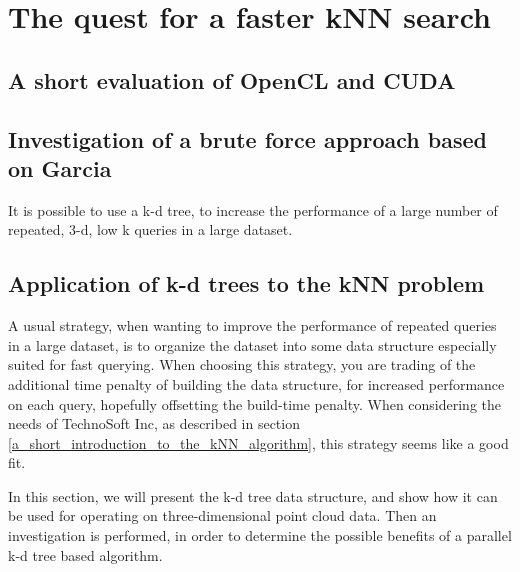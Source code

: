 
\section{The quest for a faster kNN search} %
\label{sec:the_quest_for_a_faster_knn_search}

\subsection{A short evaluation of OpenCL and CUDA} %
\label{sub:a_short_evaluation_of_opencl_and_cuda}


\subsection{Investigation of a brute force approach based on Garcia} %
\label{sub:investigation_of_a_brute_force_approach_based_on_garcia}


\begin{myrq}
\label{rq:structure_aml}
    It is possible to use a k-d tree, to increase the performance of a large number of repeated, 3-d, low k queries in a large dataset.
\end{myrq}


\subsection{Application of k-d trees to the kNN problem} %
\label{sub:application_of_kd_trees_to_the_knn_problem}

A usual strategy, when wanting to improve the performance of repeated queries in a large dataset, is to organize the dataset into some data structure especially suited for fast querying. When choosing this strategy, you are trading of the additional time penalty of building the data structure, for increased performance on each query, hopefully offsetting the build-time penalty. When considering the needs of TechnoSoft Inc, as described in section \ref{a_short_introduction_to_the_kNN_algorithm}, this strategy seems like a good fit.

In this section, we will present the k-d tree data structure, and show how it can be used for operating on three-dimensional point cloud data. Then an investigation is performed, in order to determine the possible benefits of a parallel k-d tree based algorithm.


